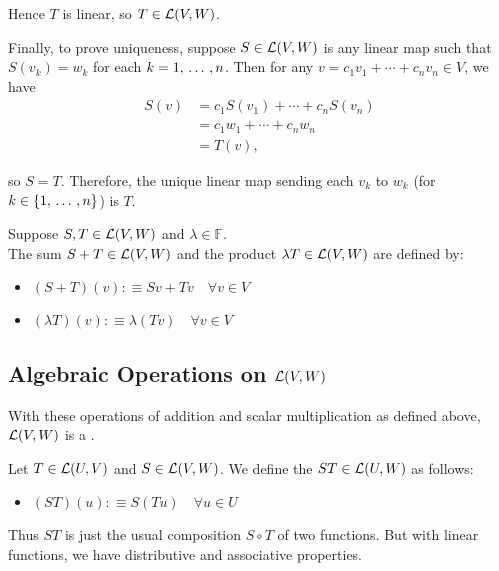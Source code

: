 \begin{prf}
  Hence $T$ is linear, so $T \in \mathcal{L}(V,W)$.

  Finally, to prove uniqueness, suppose \( S \in \mathcal{L}(V, W) \) is any linear map such that \( S(v_k) = w_k \) for each $k=1, {\, \ldots \,\,}, n$. Then for any \( v = c_1 v_1 + \cdots + c_n v_n \in V \), we have
  \begin{align}
    S(v) &= c_1 S(v_1) + \cdots + c_n S(v_n) \\
         &= c_1 w_1 + \cdots + c_n w_n \\
         &= T(v),
  \end{align}

  so \( S = T \). Therefore, the unique linear map sending each $v_k$ to $w_k$ (for $k \in \{1, {\, \ldots \,\,}, n \}$) is $T$.
\end{prf}

\setcounter{thm}{4}
\begin{mydef} 
  Suppose $S, T \in {\mathcal{L}(V,W)}$ and $\lambda \in \mathbb{F}.$ \\
  The sum $S+T \in \mathcal{L} (V,W)$ and the product $\lambda T \in \mathcal{L} (V,W)$ are defined by:
  \begin{itemize}
    \item $(S+T)(v) :\equiv Sv+Tv \quad \forall v \in V$
    \item $(\lambda T)(v) : \equiv \lambda (Tv) \quad \forall v \in V$
  \end{itemize}
\end{mydef}

\subsection{Algebraic Operations on \texorpdfstring{$\mathcal{L}(V,W)$}{L(V,W)}}
\setcounter{thm}{5}
\begin{thm} [$\lvw$]
  With these operations of addition and scalar multiplication as defined above, $\lvw$ is a \vs.
\end{thm}

\setcounter{thm}{6}
\begin{mydef}
  Let $T \in {\mathcal{L}(U, V)}$ and $S \in {\mathcal{L}(V, W)}$. We define the  $ST \in {\mathcal{L}(U, W)}$ as follows:
  \begin{itemize}
    \item[] $(ST)(u) :\equiv S(Tu) \quad \forall u \in U$
  \end{itemize}
  Thus $ST$ is just the usual composition  $S \circ T$ of two functions. But with linear functions, we have distributive and associative properties.
\end{mydef}

